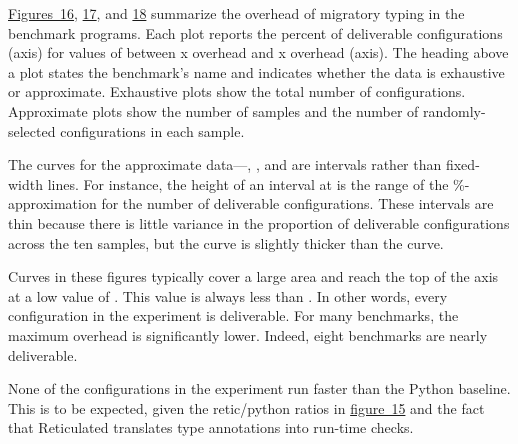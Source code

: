 \documentclass[ twoside,open=right,titlepage,numbers=noenddot,headinclude,%
                footinclude=true,cleardoublepage=empty,abstract=off,
                BCOR=5mm,paper=a4,fontsize=11pt,%
                ngerman,american,%
                parts,pdfspacing]{scrreprt}
\newcommand{\FigureRef}[2]{#1}
\begin{document}
\hyperref[t:x28counter_x28x22figurex22_x22figx3arpx3aoverheadx3a0x22x29x29]{Figures~\FigureRef{16}{t:x28counter_x28x22figurex22_x22figx3arpx3aoverheadx3a0x22x29x29}}, \hyperref[t:x28counter_x28x22figurex22_x22figx3arpx3aoverheadx3a1x22x29x29]{\FigureRef{17}{t:x28counter_x28x22figurex22_x22figx3arpx3aoverheadx3a1x22x29x29}}, and \hyperref[t:x28counter_x28x22figurex22_x22figx3arpx3aoverheadx3a2x22x29x29]{\FigureRef{18}{t:x28counter_x28x22figurex22_x22figx3arpx3aoverheadx3a2x22x29x29}} summarize the overhead of migratory typing in the
 benchmark programs.
Each plot reports the percent of deliverable configurations (axis)
 for values of  between x overhead and x overhead (axis).
The heading above a plot states the benchmark{'}s name and indicates whether the
 data is exhaustive or approximate.
Exhaustive plots show the total number of configurations.
Approximate plots show the number of samples
 and the number of randomly{-}selected configurations in each sample.

The curves for the approximate data{---}, , and are intervals
 rather than fixed{-}width lines.
For instance, the height of an interval at  is the range of the
 \%{-}approximation
 for the number of deliverable configurations.
These intervals are thin because there is little variance in the proportion
 of deliverable configurations across the ten
 samples, but the  curve is slightly thicker than the
  curve.

Curves in these figures typically cover a large area and reach the
 top of the axis at a low value of .
This value is always less than .
In other words, every configuration in the
 experiment is deliverable.
For many benchmarks, the maximum overhead is significantly lower.
Indeed, eight benchmarks are nearly deliverable.

None of the configurations in the experiment run faster than the Python baseline.
This is to be expected, given the retic/python ratios in \hyperref[t:x28counter_x28x22figurex22_x22figx3arpx3aratiox22x29x29]{figure~\FigureRef{15}{t:x28counter_x28x22figurex22_x22figx3arpx3aratiox22x29x29}} and the
 fact that Reticulated translates type annotations into run{-}time checks.
\end{document}

